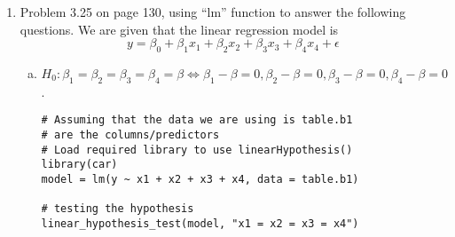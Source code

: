 \documentclass[12pt]{article}
\newcommand{\T}{\mathbf{T}}
\begin{document}
\begin{enumerate}[1.]
\begin{enumerate}[a)]
\begin{proof}
\[\begin{bmatrix}
                                \beta_0 \\ \beta_1 \\ \beta_2 \\ \vdots \\ \beta_k
                            \end{bmatrix}
                            = 
                            \begin{bmatrix} 
                                \beta_0 - \beta_1 \\ \beta_1 - \beta_2 \\ \beta_2 - \beta_3 \\ \vdots \\ \beta_{k-1} - \beta_k
                            \end{bmatrix}
                            =
                            \begin{bmatrix}
                                0 \\ 0 \\ 0 \\ \vdots \\ 0
                            \end{bmatrix}
                        \]
                        which implies that $\mathbf{c} = 0 \Rightarrow \T \beta = 0$.
                        $\therefore$ We have shown that the matrix $\T$ that represents the hypothesis $H_\gamma : \beta_0 = \beta_1 = \beta_2 = \cdots = \beta_k$ is
                    \end{proof}
                \end{enumerate}
                \item Problem 3.25 on page 130, using ``lm'' function to answer the following questions. We are given that the linear regression
                model is 
                \[ y = \beta_0 + \beta_1 x_1 + \beta_2 x_2 + \beta_3 x_3 + \beta_4 x_4 +  \epsilon\]
                \begin{enumerate}[a.]
                    \item $H_0: \beta_1 = \beta_2 = \beta_3 = \beta_4 = \beta 
                    \Leftrightarrow \beta_1 - \beta = 0, \beta_2 - \beta = 0, \beta_3 - \beta = 0, \beta_4 - \beta = 0$.
                    \begin{verbatim}
# Assuming that the data we are using is table.b1
# are the columns/predictors
# Load required library to use linearHypothesis()
library(car)
model = lm(y ~ x1 + x2 + x3 + x4, data = table.b1)

# testing the hypothesis
linear_hypothesis_test(model, "x1 = x2 = x3 = x4")
                    \end{verbatim}


\end{enumerate}
\end{enumerate}
\end{document}
